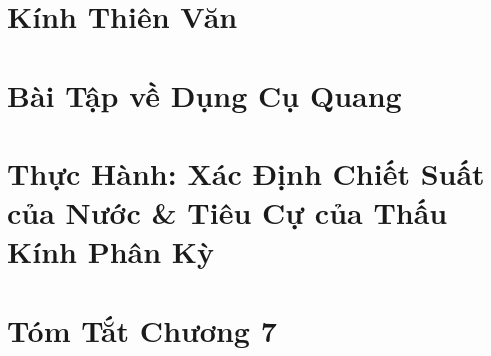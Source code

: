 \documentclass[oneside]{book}
\numberwithin{equation}{section}
\begin{document}
\section{Kính Thiên Văn}


\section{Bài Tập về Dụng Cụ Quang}


\section{Thực Hành: Xác Định Chiết Suất của Nước \& Tiêu Cự của Thấu Kính Phân Kỳ}


\section{Tóm Tắt Chương 7}


\printbibliography[heading=bibintoc]
	
\end{document}
